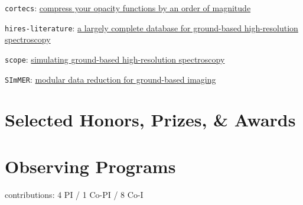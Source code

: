 \documentclass[letterpaper,12pt]{article}
\newcommand{\shorterSection}[1]{\section{#1}}
\renewcommand{\small}{\normalsize}
\renewcommand{\scriptsize}{\normalsize}
\begin{document}
\begin{list}{}{\cvlist}
    \item[{\color{numcolor}\scriptsize4}] \texttt{cortecs}: \href{https://github.com/arjunsavel/cortecs}{compress your opacity functions by an order of magnitude}
    \item[{\color{numcolor}\scriptsize3}] \texttt{hires-literature}: \href{https://github.com/arjunsavel/hires-literature}{a largely complete database for ground-based high-resolution spectroscopy}
    \item[{\color{numcolor}\scriptsize2}] \texttt{scope}: \href{https://github.com/arjunsavel/scope}{simulating ground-based high-resolution spectroscopy}
    \item[{\color{numcolor}\scriptsize1}] \texttt{SImMER}: 
    \href{https://github.com/arjunsavel/SImMER}{modular data reduction for ground-based imaging}
\end{list}

\shorterSection{Selected Honors, Prizes, \& Awards}
\small
  \begin{list}{}{\cvlist}
    
\end{list}

\shorterSection{Observing Programs}
contributions: 4 PI / 1 Co-PI / 8 Co-I
 
\end{document}
